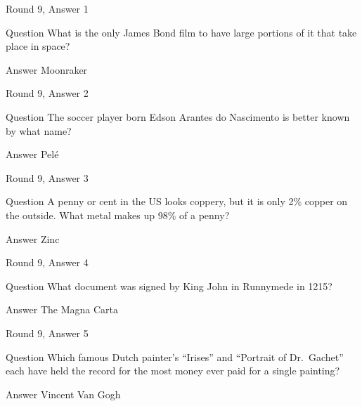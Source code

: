 \documentclass[11pt]{beamer}
\begin{document}
\begin{frame}[t]{Round 9, Answer 1}
\vspace{2em}
\begin{block}{Question}
What is the only James Bond film to have large portions of it that take place in space\@?
\end{block}
\pause{}
\begin{block}{Answer}
Moonraker
\end{block}
\end{frame}
    

\begin{frame}[t]{Round 9, Answer 2}
\vspace{2em}
\begin{block}{Question}
The soccer player born Edson Arantes do Nascimento is better known by what name\@?
\end{block}
\pause{}
\begin{block}{Answer}
Pelé
\end{block}
\end{frame}
    

\begin{frame}[t]{Round 9, Answer 3}
\vspace{2em}
\begin{block}{Question}
A penny or cent in the US looks coppery, but it is only 2\% copper on the outside. What metal makes up 98\% of a penny\@?
\end{block}
\pause{}
\begin{block}{Answer}
Zinc
\end{block}
\end{frame}
    

\begin{frame}[t]{Round 9, Answer 4}
\vspace{2em}
\begin{block}{Question}
What document was signed by King John in Runnymede in 1215\@?
\end{block}
\pause{}
\begin{block}{Answer}
The Magna Carta
\end{block}
\end{frame}
    

\begin{frame}[t]{Round 9, Answer 5}
\vspace{2em}
\begin{block}{Question}
Which famous Dutch painter's ``Irises'' and ``Portrait of Dr.\ Gachet'' each have held the record for the most money ever paid for a single painting\@?
\end{block}
\pause{}
\begin{block}{Answer}
Vincent Van Gogh
\end{block}
\end{frame}
    
\end{document}
